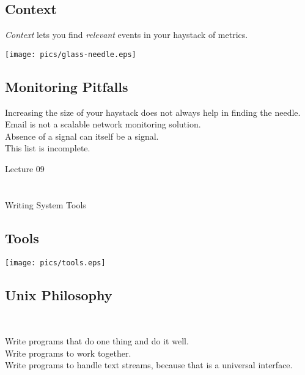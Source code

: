 \documentclass[xga]{xdvislides}
\begin{document}
\subsection{Context}
{\em Context} lets you find {\em relevant} events in
your haystack of metrics.

\begin{center}
	\texttt{[image: pics/glass-needle.eps]}
\end{center}

\subsection{Monitoring Pitfalls}
\vspace*{\fill}
\Huge
\begin{center}
Increasing the size of your haystack does not always
help in finding the needle. \\
\vspace{.4in}
Email is not a scalable network monitoring solution. \\
\vspace{.4in}
Absence of a signal can itself be a signal. \\
\vspace{.4in}
This list is incomplete.
\end{center}
\Normalsize
\vspace*{\fill}

\newpage
\vspace*{\fill}
\begin{center}
    \Hugesize
        Lecture 09 \\ [1em]
    \hspace*{5mm}
    \blueline\\
    \hspace*{5mm}\\
	Writing System Tools
\end{center}
\vspace*{\fill}

\subsection{Tools}
\vspace*{\fill}
\begin{center}
	\texttt{[image: pics/tools.eps]}
\end{center}
\vspace*{\fill}

\subsection{Unix Philosophy}
\\
\Huge
\begin{center}
	Write programs that do one thing and do it well.\\
	\vspace{.5in}
	Write programs to work together. \\
	\vspace{.5in}
	Write programs to handle text streams, because that is a universal interface.
\end{center}
\Normalsize
\end{document}
